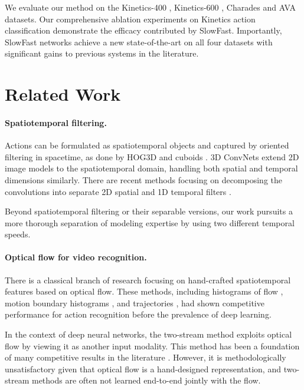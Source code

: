 \documentclass[10pt,twocolumn,letterpaper]{article}
\begin{document}
	We  evaluate our method on the Kinetics-400 \cite{Kay2017}, Kinetics-600 \cite{Carreira2018}, Charades \cite{Sigurdsson2016} and AVA \cite{Gu2018} datasets. Our comprehensive ablation experiments 	on Kinetics action classification demonstrate the efficacy contributed by SlowFast.  Importantly, SlowFast networks achieve a new state-of-the-art on all four datasets with significant gains to previous systems in the literature.
	
	\section{Related Work}
	\label{sec:related_work}
	
	\paragraph{Spatiotemporal filtering.}
	Actions can be formulated as spatiotemporal objects and captured by oriented filtering in spacetime, as done by HOG3D \cite{Klaeser2008} and cuboids \cite{Dollar2005}.
	3D ConvNets \cite{Taylor2010,Tran2015,Carreira2017} extend 2D image models \cite{Krizhevsky2012,Simonyan2015,Szegedy2015,He2016} to the spatiotemporal domain, handling both spatial and temporal dimensions similarly.
	There are recent methods focusing on decomposing the convolutions into separate 2D spatial and 1D temporal filters \cite{Feichtenhofer2016a,Tran2018,Xie2018,Qiu2017}.
	
	Beyond spatiotemporal filtering or their separable versions, our work pursuits a more thorough separation of modeling expertise by using two different temporal speeds.
	
	\paragraph{Optical flow for video recognition.}
	There is a classical branch of research focusing on hand-crafted spatiotemporal features based on optical flow.
	These methods, including histograms of flow \cite{Laptev2008}, motion boundary histograms \cite{Dalal2006}, and trajectories \cite{Wang2013}, had shown competitive performance for action recognition before the prevalence of deep learning.
	
	In the context of deep neural networks, the two-stream method \cite{Simonyan2014} exploits optical flow by viewing it as another input modality. This method has been a foundation of many competitive results in the literature \cite{Feichtenhofer2016a,Feichtenhofer2016,Wang2016a}.
	However, it is methodologically unsatisfactory given that optical flow is a hand-designed representation, and two-stream methods are often not learned end-to-end jointly with the flow.  
	
\end{document}
